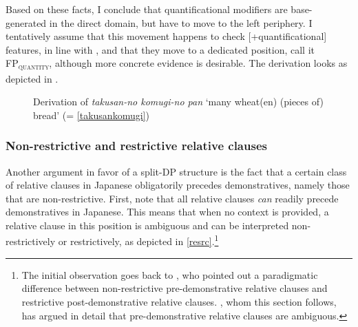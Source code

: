 Based on these facts, I conclude that quantificational modifiers are base-genera\-ted in the direct domain, but have to move to the left periphery. I tentatively assume that this movement happens to check [+quantificational] features, in line with \citet{kim:2019:syntax}, and that they move to a dedicated position, call it FP\textsubscript{\textsc{quantity}}, although more concrete evidence is desirable. The derivation looks as depicted in .

\begin{figure}[t]
\centering
{}
\caption{Derivation of \textit{takusan-no komugi-no pan} `many wheat(en) (pieces of) bread’ (= \ref{takusankomugi})}
\label{Derivation takusan.no komugi-no pani}
\end{figure}

\subsubsection{Non-restrictive and restrictive relative clauses} \label{RC LP}

Another argument in favor of a split-DP structure is the fact that a certain class of relative clauses in Japanese obligatorily precedes demonstratives, namely those that are non-restrictive. First, note that all relative clauses \textit{can} readily precede demonstratives in Japanese. This means that when no context is provided, a relative clause in this position is ambiguous and can be interpreted non-restrictively or restrictively, as depicted in \ref{resrc}.\footnote{The initial observation goes back to \citet{kamio:1977:restrictive}, who pointed out a paradigmatic difference between non-restrictive pre-demonstrative relative clauses and restrictive post-demonstrative relative clauses. \citet{ishizuka:2008:RC}, whom this section follows, has argued in detail that pre-demonstrative relative clauses are ambiguous.}

